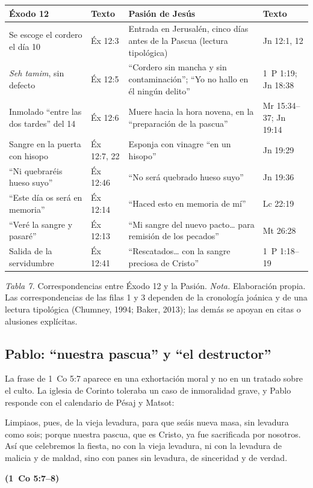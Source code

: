 \documentclass[11pt,letterpaper]{article}
\newcommand{\fuente}[1]{\par\hfill{\upshape\bfseries\small\textcolor{tierraroja}{#1}}}
\begin{document}
\begin{table}[!htbp]\centering\small\renewcommand{\arraystretch}{1.2}
\begin{tabular}{@{}L{4.0cm}L{2.4cm}L{5.2cm}L{2.6cm}@{}}
\toprule
\textbf{Éxodo 12} & \textbf{Texto} & \textbf{Pasión de Jesús} & \textbf{Texto} \\ \midrule
Se escoge el cordero el día 10 & Éx 12:3 & Entrada en Jerusalén, cinco días antes de la Pascua (lectura tipológica) & Jn 12:1, 12 \\
\emph{Seh tamim}, sin defecto & Éx 12:5 & ``Cordero sin mancha y sin contaminación''; ``Yo no hallo en él ningún delito'' & 1~P 1:19; Jn 18:38 \\
Inmolado ``entre las dos tardes'' del 14 & Éx 12:6 & Muere hacia la hora novena, en la ``preparación de la pascua'' & Mr 15:34--37; Jn 19:14 \\
Sangre en la puerta con hisopo & Éx 12:7, 22 & Esponja con vinagre ``en un hisopo'' & Jn 19:29 \\
``Ni quebraréis hueso suyo'' & Éx 12:46 & ``No será quebrado hueso suyo'' & Jn 19:36 \\
``Este día os será en memoria'' & Éx 12:14 & ``Haced esto en memoria de mí'' & Lc 22:19 \\
``Veré la sangre y pasaré'' & Éx 12:13 & ``Mi sangre del nuevo pacto\ldots{} para remisión de los pecados'' & Mt 26:28 \\
Salida de la servidumbre & Éx 12:41 & ``Rescatados\ldots{} con la sangre preciosa de Cristo'' & 1~P 1:18--19 \\
\bottomrule
\end{tabular}\par
{\footnotesize\color{sepia}\textit{Tabla 7.} Correspondencias entre Éxodo 12 y la Pasión. \textit{Nota.} Elaboración propia. Las correspondencias de las filas 1 y 3 dependen de la cronología joánica y de una lectura tipológica (Chumney, 1994; Baker, 2013); las demás se apoyan en citas o alusiones explícitas.}
\end{table}

\subsection{Pablo: ``nuestra pascua'' y ``el destructor''}
La frase de 1~Co 5:7 aparece en una exhortación moral y no en un tratado sobre el culto. La iglesia de Corinto toleraba un caso de inmoralidad grave, y Pablo responde con el calendario de Pésaj y Matsot:

\begin{cita}Limpiaos, pues, de la vieja levadura, para que seáis nueva masa, sin levadura como sois; porque nuestra pascua, que es Cristo, ya fue sacrificada por nosotros. Así que celebremos la fiesta, no con la vieja levadura, ni con la levadura de malicia y de maldad, sino con panes sin levadura, de sinceridad y de verdad.\fuente{(1~Co 5:7--8)}\end{cita}
\end{document}
